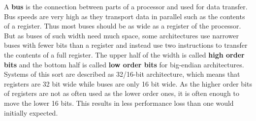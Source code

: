 {A \textbf{bus} is the connection between parts of a processor and used for data transfer.
Bus speeds are very high as they transport data in parallel such as the contents of a register.
Thus most buses should be as wide as a register of the processor.
But as buses of such width need much space, some architectures use narrower buses with fewer bits than a register and instead use two instructions to transfer the contents of a full register.
The upper half of the width is called \textbf{high order bits} and the bottom half is called \textbf{low order bits} for big-endian architectures.
Systems of this sort are described as 32/16-bit architecture, which means that registers are 32 bit wide while buses are only 16 bit wide.
As the higher order bits of registers are not as often used as the lower order ones, it is often enough to move the lower 16 bits.
This results in less performance loss than one would initially expected.

}
